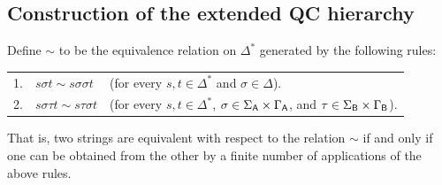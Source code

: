 \subsection{Construction of the extended QC hierarchy} \label{sec:construction-of-the-extended-qc-hierarchy}

Define $\sim$ to be the equivalence relation on $\Delta^{\ast}$
generated by the following rules:\vspace{2mm}

\noindent
\begin{tabular}{@{\hspace*{1.2mm}}lll}
  1. \hspace*{-3mm} & $s \sigma t \sim s \sigma \sigma t$ & (for every
  $s,t\in\Delta^{\ast}$ and $\sigma \in \Delta$).\\[1mm]
  2. \hspace*{-3mm} & $s \sigma \tau t \sim s \tau \sigma t$ & 
  (for every $s,t\in\Delta^{\ast}$, $\sigma \in \Sigma_{\mathsf{A}} \times \Gamma_{\mathsf{A}}$, and 
  $\tau\in \Sigma_{\mathsf{B}} \times \Gamma_{\mathsf{B}}$).\\[2mm]
\end{tabular}

\noindent
That is, two strings are equivalent with respect to the relation $\sim$
if and only if one can be obtained from the other by a finite number of
applications of the above rules.

